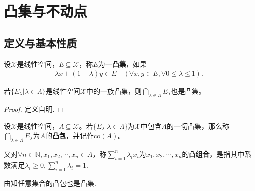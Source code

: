 \documentclass[../../main.tex]{subfiles}%
\begin{document}
\section{凸集与不动点}

\subsection{定义与基本性质}

\begin{definition}
设$\mathscr{X}$是线性空间，$E \subseteq \mathscr{X}$，称$E$为一\textbf{凸集}，如果
\begin{align*}
\lambda x + (1 - \lambda) y \in E \quad (\forall x, y \in E, \forall 0 \leqslant \lambda \leqslant 1).
\end{align*}
\end{definition}

\begin{proposition}\label{proposition:凸集任意交仍是凸集}
若$\{E_\lambda | \lambda \in \Lambda\}$是线性空间$\mathscr{X}$中的一族凸集，则$\bigcap\limits_{\lambda \in \Lambda} E_\lambda$也是凸集。
\end{proposition}
\begin{proof}

定义自明.
\end{proof}

\begin{definition}
设$\mathscr{X}$是线性空间，$A \subseteq \mathscr{X}$。若$\{E_\lambda | \lambda \in \Lambda\}$为$\mathscr{X}$中包含$A$的一切凸集，那么称$\bigcap\limits_{\lambda \in \Lambda} E_\lambda$为$A$的\textbf{凸包}，并记作$\mathrm{co}(A)$。

又对$\forall n \in \mathbb{N}, x_1, x_2, \cdots, x_n \in A$，称$\sum\limits_{i=1}^n \lambda_i x_i$为$x_1, x_2, \cdots, x_n$的\textbf{凸组合}，是指其中系数满足$\lambda_i \geqslant 0, \sum\limits_{i=1}^n \lambda_i = 1$.
\end{definition}
\begin{remark}
由知任意集合的凸包也是凸集.
\end{remark}
\end{document}
